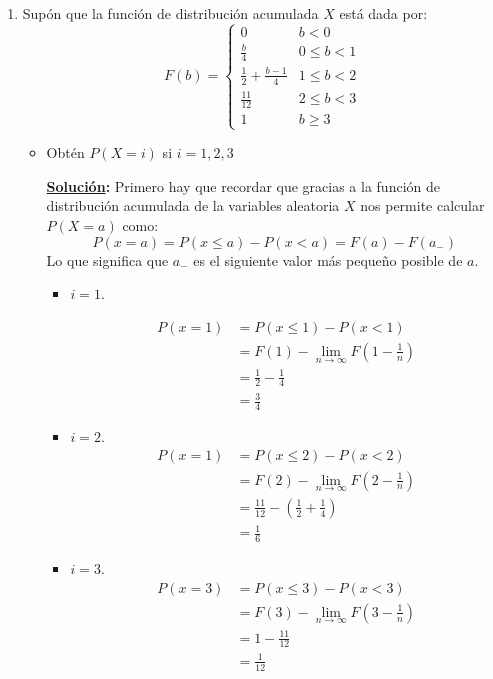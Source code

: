 \documentclass[11pt,letterpaper]{report}
\newcommand{\sol}{\textbf{\underline{Solución}: }} %
\begin{document}
\begin{enumerate}

\item Supón que la función de distribución acumulada $X$ está dada por:
\[
    F(b) =
        \begin{cases}
            0   & b < 0\\
            \frac{b}{4}    & 0 \leq b < 1\\
            \frac{1}{2} + \frac{b-1}{4}    & 1 \leq b < 2\\
            \frac{11}{12}    & 2 \leq b < 3\\
            1   & b \geq 3
        \end{cases}
\]
\begin{itemize}
    \item Obtén $P(X = i)$ si $i=1,2,3$
    
    \sol
    Primero hay que recordar que gracias a la función de distribución acumulada de la variables
    aleatoria $X$ nos permite calcular $P(X=a)$ como:
    $$P(x=a) = P(x \leq a) - P(x < a) = F(a) - F(a_-)$$
    Lo que significa que $a_-$ es el siguiente valor más pequeño posible de $a$.
    \begin{itemize}
        \item $i=1$.
        
        \begin{align*}
            P(x = 1)
                &= P(x \leq 1) - P(x < 1)\\
                &= F(1) - \lim_{n \to \infty}F(1 - \frac{1}{n})\\
                &= \frac{1}{2} - \frac{1}{4}\\
                &= \frac{3}{4}
        \end{align*}

        \item $i = 2$.
        \begin{align*}
            P(x = 1)
                &= P(x \leq 2) - P(x < 2)\\
                &= F(2) - \lim_{n \to \infty}F(2 - \frac{1}{n})\\
                &= \frac{11}{12} - (\frac{1}{2} + \frac{1}{4})\\
                &= \frac{1}{6}
        \end{align*}

        \item $i = 3$.
        \begin{align*}
            P(x = 3)
                &= P(x \leq 3) - P(x < 3)\\
                &= F(3) - \lim_{n \to \infty}F(3 - \frac{1}{n})\\
                &= 1 - \frac{11}{12}\\
                &= \frac{1}{12}
        \end{align*}
    \end{itemize}


\end{itemize}
\end{enumerate}
\end{document}
